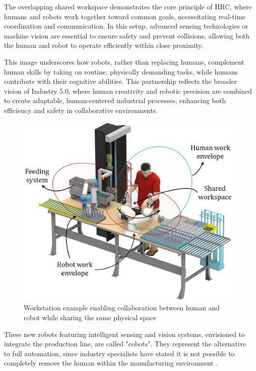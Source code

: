 The overlapping shared workspace demonstrates the core principle of \ac{HRC}, where humans and robots work together toward common goals, necessitating real-time coordination and communication. In this setup, advanced sensing technologies or machine vision are essential to ensure safety and prevent collisions, allowing both the human and robot to operate efficiently within close proximity.

This image underscores how robots, rather than replacing humans, complement human skills by taking on routine, physically demanding tasks, while humans contribute with their cognitive abilities. This partnership reflects the broader vision of Industry 5.0, where human creativity and robotic precision are combined to create adaptable, human-centered industrial processes, enhancing both efficiency and safety in collaborative environments.

\begin{figure}[!htbp]
    \centering
    \includegraphics[width=0.7\linewidth]{figs/workspace-station-high-res-image.jpg}
    \caption{Workstation example enabling collaboration between human and robot while sharing the same physical space~\cite{MALIK2021102092}} 
    \label{fig:hrc-workstation}
\end{figure} 


These new robots featuring intelligent sensing and vision systems, envisioned to integrate the production line, are called "cobots". 
They represent the alternative to full automation, since industry specialists have stated it is not possible to completely remove the 
human within the manufacturing environment \cite{Weiss2021}.

